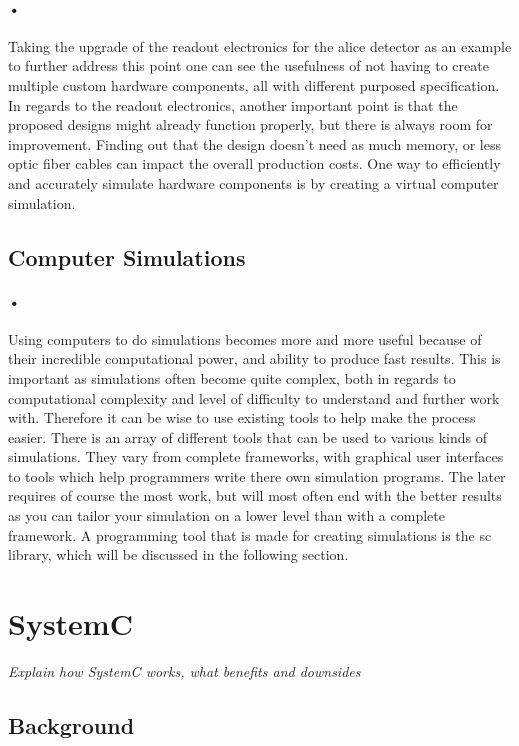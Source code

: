 \documentclass[a4paper, 12pt]{report}
\begin{document}
\paragraph{•}
Taking the upgrade of the readout electronics for the \gls{alice} detector as an example to further address this point one can see the usefulness of not having to create multiple custom hardware components, all with different purposed specification.
In regards to the readout electronics, another important point is that the proposed designs might already function properly, but there is always room for improvement.
Finding out that the design doesn't need as much memory, or less optic fiber cables can impact the overall production costs.
One way to efficiently and accurately simulate hardware components is by creating a virtual computer simulation.

\subsection{Computer Simulations}
\paragraph{•}
Using computers to do simulations becomes more and more useful because of their incredible computational power, and ability to produce fast results.
This is important as simulations often become quite complex, both in regards to computational complexity and level of difficulty to understand and further work with.
Therefore it can be wise to use existing tools to help make the process easier.
There is an array of different tools that can be used to various kinds of simulations.
They vary from complete frameworks, with graphical user interfaces to tools which help programmers write there own simulation programs.
The later requires of course the most work, but will most often end with the better results as you can tailor your simulation on a lower level than with a complete framework.
A programming tool that is made for creating simulations is the \gls{sc} library, which will be discussed in the following section.

\section{SystemC}
\textit{Explain how SystemC works, what benefits and downsides}

\subsection{Background}
\end{document}
